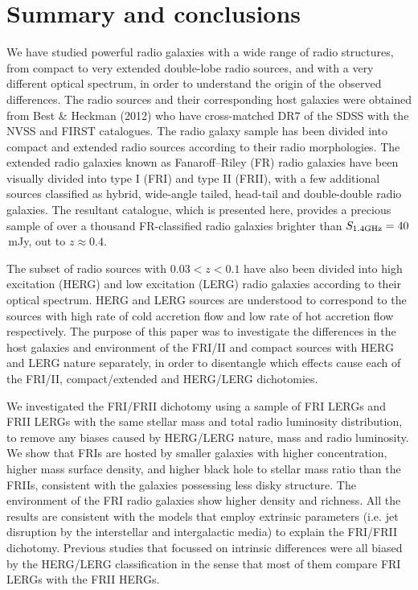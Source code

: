 \documentclass[usenatbib]{mn2e}
\begin{document}
 
\section{Summary and conclusions}
\label{sec:summery}

We have studied powerful radio galaxies with a wide range of radio
structures, from compact to very extended double-lobe radio sources, and
with a very different optical spectrum, in order to understand the origin
of the observed differences. The radio sources and their corresponding
host galaxies were obtained from Best \& Heckman (2012) who have
cross-matched DR7 of the SDSS with the NVSS and FIRST catalogues. The
radio galaxy sample has been divided into compact and extended radio
sources according to their radio morphologies. The extended radio galaxies
known as Fanaroff--Riley (FR) radio galaxies have been visually divided
into type I (FRI) and type II (FRII), with a few additional sources
classified as hybrid, wide-angle tailed, head-tail and
double-double radio galaxies. The resultant catalogue, which is
presented here, provides a precious sample of over a thousand
FR-classified radio galaxies brighter than $S_{\rm 1.4 GHz} = 40$\,mJy,
out to $z \approx 0.4$.

The subset of radio sources with $0.03 < z < 0.1$ have also been divided
into high excitation (HERG) and low excitation (LERG) radio galaxies
according to their optical spectrum. HERG and LERG sources are understood
to correspond to the sources with high rate of cold accretion flow and low
rate of hot accretion flow respectively. The purpose of this paper was
to investigate the differences in the host galaxies and environment of the
FRI/II and compact sources with HERG and LERG nature separately, in order
to disentangle which effects cause each of the FRI/II, compact/extended
and HERG/LERG dichotomies.

We investigated the FRI/FRII dichotomy using a sample of FRI LERGs and
FRII LERGs with the same stellar mass and total radio luminosity
distribution, to remove any biases caused by HERG/LERG nature, mass and
radio luminosity. We show that FRIs are hosted by smaller galaxies with
higher concentration, higher mass surface density, and higher black hole
to stellar mass ratio than the FRIIs, consistent with the galaxies
possessing less disky structure. The environment of the FRI radio galaxies
show higher density and richness. All the results are consistent with the
models that employ extrinsic parameters (i.e. jet disruption by the 
interstellar and intergalactic media) to explain the FRI/FRII
dichotomy. Previous studies that focussed on intrinsic differences were
all biased by the HERG/LERG classification in the sense that most of them
compare FRI LERGs with the FRII HERGs.
   
\end{document}

